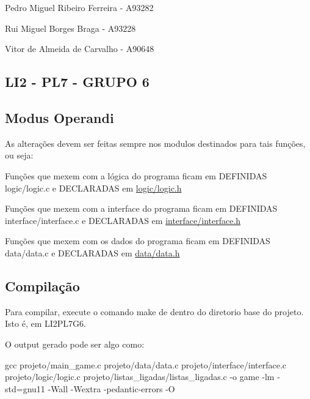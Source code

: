 Pedro Miguel Ribeiro Ferreira -\/ A93282

Rui Miguel Borges Braga -\/ A93228

Vitor de Almeida de Carvalho -\/ A90648

\subsection*{L\+I2 -\/ P\+L7 -\/ G\+R\+U\+PO 6 }

\subsection*{Modus Operandi }

As alterações devem ser feitas sempre nos modulos destinados para tais funções, ou seja\+:

Funções que mexem com a lógica do programa ficam em D\+E\+F\+I\+N\+I\+D\+AS logic/logic.\+c e D\+E\+C\+L\+A\+R\+A\+D\+AS em \hyperlink{logic_8h}{logic/logic.\+h}

Funções que mexem com a interface do programa ficam em D\+E\+F\+I\+N\+I\+D\+AS interface/interface.\+c e D\+E\+C\+L\+A\+R\+A\+D\+AS em \hyperlink{interface_8h}{interface/interface.\+h}

Funções que mexem com os dados do programa ficam em D\+E\+F\+I\+N\+I\+D\+AS data/data.\+c e D\+E\+C\+L\+A\+R\+A\+D\+AS em \hyperlink{data_8h}{data/data.\+h}

\subsection*{Compilação }

Para compilar, execute o comando \textquotesingle{}make\textquotesingle{} de dentro do diretorio base do projeto. Isto é, em L\+I2\+P\+L7\+G6.

O output gerado pode ser algo como\+: 
\begin{DoxyCode}
gcc projeto/main\_game.c projeto/data/data.c projeto/interface/interface.c projeto/logic/logic.c
       projeto/listas\_ligadas/listas\_ligadas.c -o game -lm -std=gnu11 -Wall -Wextra -pedantic-errors -O
\end{DoxyCode}
 